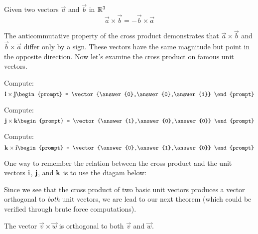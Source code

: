 \documentclass{ximera}
\begin{document}
\begin{theorem}
  Given two vectors $\vec{a}$ and $\vec{b}$ in $\mathbb R^3$
  \[
  \vec{a} \times\vec{b} = -\vec{b}\times\vec{a}
  \]
\end{theorem}
The anticommutative property of the cross product demonstrates that
$\vec{a}\times\vec{b}$ and $\vec{b}\times\vec{a}$ differ only by a
sign. These vectors have the same magnitude but point in the opposite
direction. Now let's examine the cross product on famous unit vectors.
\begin{question}
  Compute:
  \[
  \veci \times \vecj
  \begin{prompt}
    = \vector{\answer{0},\answer{0},\answer{1}}
  \end{prompt}
  \]
  \begin{question}
  Compute:
  \[
  \vecj\times\veck 
  \begin{prompt}
    = \vector{\answer{1},\answer{0},\answer{0}}
  \end{prompt}
  \]
  \begin{question}
  Compute:
  \[
  \veck\times\veci 
  \begin{prompt}
    = \vector{\answer{0},\answer{1},\answer{0}}
  \end{prompt}
  \]
\end{question}
\end{question}
\end{question}

One way to remember the relation between the cross product and the unit vectors $\mathbf{i}$, $\mathbf{j}$, and $\mathbf{k}$ is to use the diagam below:
\begin{image}
\end{image}

Since we see that the cross product of two basic unit vectors produces
a vector orthogonal to \textit{both} unit vectors, we are lead to our
next theorem (which could be verified through brute force
computations).

\begin{theorem}
  The vector $\vec{v}\times\vec{w}$ is orthogonal to both $\vec{v}$
  and $\vec{w}$.
\end{theorem}
\end{document}
